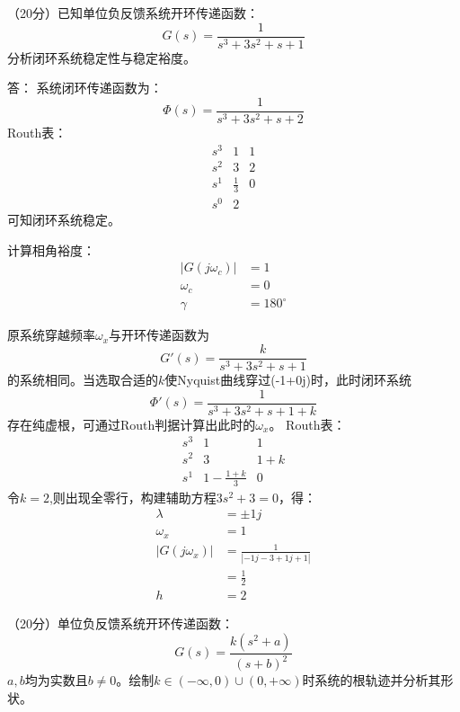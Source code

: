 \question（20分）已知单位负反馈系统开环传递函数：
$$G(s)=\frac{1}{s^3+3s^2+s+1}$$
分析闭环系统稳定性与稳定裕度。


\onlyanswer
{
	答：
	系统闭环传递函数为：
	$$\Phi(s)=\frac{1}{s^3+3s^2+s+2}$$
	Routh表：
$$
\begin{matrix}
 s^3  & 1 & 1 \\
 s^2  & 3 & 2 \\
 s^1  & \frac{1}{3}  & 0 \\
 s^0  & 2
\end{matrix}
$$
可知闭环系统稳定。

计算相角裕度：
\begin{align*}
|G(j\omega_c)|&=1\\
\omega_c &=0\\
\gamma &=180^\circ
\end{align*}

原系统穿越频率$\omega_x$与开环传递函数为
$$G'(s)=\frac{k}{s^3+3s^2+s+1}$$
的系统相同。当选取合适的$k$使Nyquist曲线穿过(-1+0j)时，此时闭环系统
	$$\Phi'(s)=\frac{1}{s^3+3s^2+s+1+k}$$
存在纯虚根，可通过Routh判据计算出此时的$\omega_x$。
	Routh表：
	$$
	\begin{matrix}
	s^3  & 1 & 1 \\
	s^2  & 3 & 1+k \\
	s^1  & 1-\frac{1+k}{3} & 0 
	\end{matrix}
	$$
令$k=2$,则出现全零行，构建辅助方程$3s^2+3=0$，得：
\begin{align*}
\lambda &=\pm 1j \\
\omega_x &=1 \\
|G(j\omega_x )| &=\frac{1}{|-1j-3+1j+1|} \\
 &=\frac{1}{2} \\
h &= 2
\end{align*}


}

\question（20分）单位负反馈系统开环传递函数：
$$G(s)=\frac{k(s^2+a)}{(s+b)^2}$$
$a,b$均为实数且$b\neq 0$。绘制$k\in (-\infty,0)\cup (0,+\infty)$时系统的根轨迹并分析其形状。


